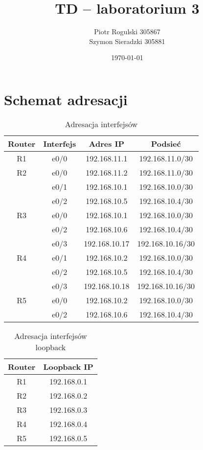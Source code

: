 \documentclass[a4paper,12pt,notitlepage]{article}
\title{\textbf{TD -- laboratorium 3}}
\author{Piotr Rogulski 305867 \\ Szymon Sieradzki 305881}
\date{\today}
\begin{document}
\maketitle
\section*{Schemat adresacji}

\begin{table}[!htb]
    \caption{Adresacja interfejsów}
    \centering
    \begin{tabular}{*4c}
        \hline\hline
            \textbf{Router} & \textbf{Interfejs} & \textbf{Adres IP} & \textbf{Podsieć} \\
        \hline
            \rowcolor{bg}
            R1 & e0/0 & 192.168.11.1  & 192.168.11.0/30 \\
        \hline
            \rowcolor{bg}
            R2 & e0/0 & 192.168.11.2  & 192.168.11.0/30 \\
               & e0/1 & 192.168.10.1  & 192.168.10.0/30 \\
               & e0/2 & 192.168.10.5  & 192.168.10.4/30 \\
        \hline
            R3 & e0/0 & 192.168.10.1  & 192.168.10.0/30 \\
               & e0/2 & 192.168.10.6  & 192.168.10.4/30 \\
               & e0/3 & 192.168.10.17 & 192.168.10.16/30 \\
        \hline
            R4 & e0/1 & 192.168.10.2  & 192.168.10.0/30 \\
               & e0/2 & 192.168.10.5  & 192.168.10.4/30 \\
               & e0/3 & 192.168.10.18 & 192.168.10.16/30 \\
        \hline
            R5 & e0/0 & 192.168.10.2  & 192.168.10.0/30 \\
               & e0/2 & 192.168.10.6  & 192.168.10.4/30 \\
        \hline\hline
    \end{tabular}
\end{table}

\begin{table}[!htb]
    \caption{Adresacja interfejsów loopback}
    \centering
    \begin{tabular}{*2c}
        \hline\hline
            \textbf{Router} & \textbf{Loopback IP} \\
        \hline
            R1 & 192.168.0.1 \\
            R2 & 192.168.0.2 \\
            R3 & 192.168.0.3 \\
            R4 & 192.168.0.4 \\
            R5 & 192.168.0.5 \\
        \hline\hline
    \end{tabular}
\end{table}
\end{document}
